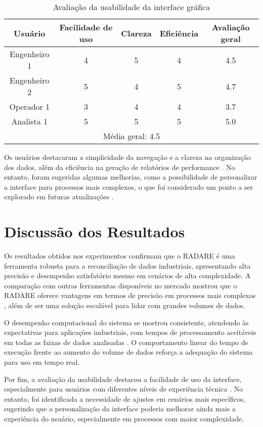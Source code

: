 \begin{table}[htbp]
    \centering
    \caption{Avaliação da usabilidade da interface gráfica}
    \label{Tab:Usabilidade}
    \begin{tabular}{|c|c|c|c|c|}
        \hline
        Usuário & Facilidade de uso & Clareza & Eficiência & Avaliação geral \\ \hline
        Engenheiro 1 & 4 & 5 & 4 & 4.5 \\ \hline
        Engenheiro 2 & 5 & 4 & 5 & 4.7 \\ \hline
        Operador 1 & 3 & 4 & 4 & 3.7 \\ \hline
        Analista 1 & 5 & 5 & 5 & 5.0 \\ \hline
        \multicolumn{5}{|c|}{Média geral: 4.5} \\ \hline
    \end{tabular}
\end{table}

Os usuários destacaram a simplicidade da navegação e a clareza na organização dos dados, além da eficiência na geração de relatórios de performance \cite{performanceReporting}. No entanto, foram sugeridas algumas melhorias, como a possibilidade de personalizar a interface para processos mais complexos, o que foi considerado um ponto a ser explorado em futuras atualizações \cite{customizationForIndustry}.

\section{Discussão dos Resultados}
\label{Sec:DiscussaoResultados}

Os resultados obtidos nos experimentos confirmam que o RADARE é uma ferramenta robusta para a reconciliação de dados industriais, apresentando alta precisão e desempenho satisfatório mesmo em cenários de alta complexidade. A comparação com outras ferramentas disponíveis no mercado mostrou que o RADARE oferece vantagens em termos de precisão em processos mais complexos \cite{comparisonToTools}, além de ser uma solução escalável para lidar com grandes volumes de dados.

O desempenho computacional do sistema se mostrou consistente, atendendo às expectativas para aplicações industriais, com tempos de processamento aceitáveis em todas as faixas de dados analisadas \cite{computationalPerformanceIndustry}. O comportamento linear do tempo de execução frente ao aumento do volume de dados reforça a adequação do sistema para uso em tempo real.

Por fim, a avaliação da usabilidade destacou a facilidade de uso da interface, especialmente para usuários com diferentes níveis de experiência técnica \cite{userExperienceIndustry}. No entanto, foi identificada a necessidade de ajustes em cenários mais específicos, sugerindo que a personalização da interface poderia melhorar ainda mais a experiência do usuário, especialmente em processos com maior complexidade.
